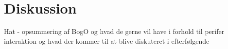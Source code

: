 \chapter{Diskussion}
\label{SamletDiskussion}
%

Hat - opsummering af BogO og hvad de gerne vil have i forhold til perifer interaktion og hvad der kommer til at blive diskuteret i efterfølgende




%

% 




